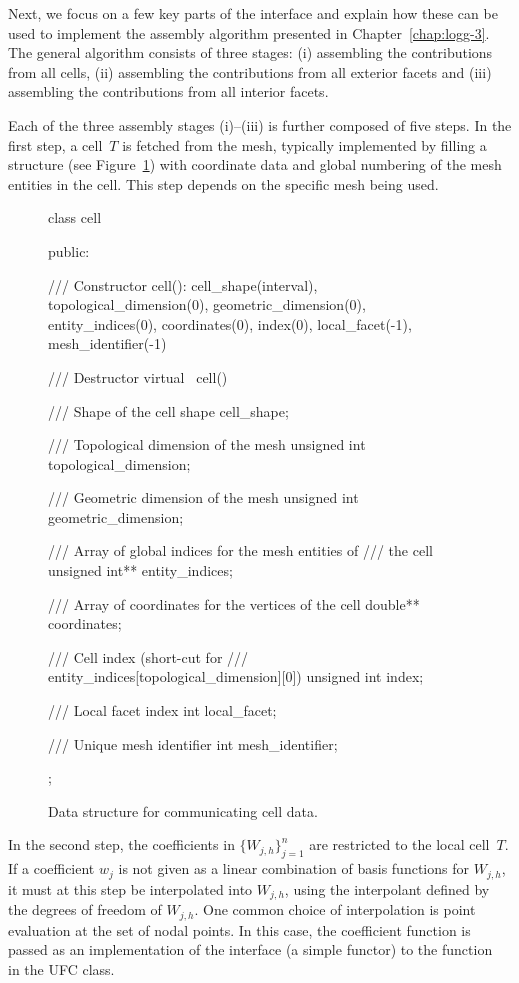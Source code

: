 Next, we focus on a few key parts of the interface and explain how
these can be used to implement the assembly algorithm presented in
Chapter~\ref{chap:logg-3}. The general algorithm consists of three
stages: (i) assembling the contributions from all cells, (ii)
assembling the contributions from all exterior facets and (iii)
assembling the contributions from all interior facets.

Each of the three assembly stages (i)--(iii) is further composed of
five steps. In the first step, a cell~$T$ is fetched from the mesh,
typically implemented by filling a  structure (see
Figure~\ref{fig:cellcode}) with coordinate data and global numbering
of the mesh entities in the cell. This step depends on the specific
mesh being used.

\begin{figure}
\bwfig
\begin{c++}
class cell
{
public:

  /// Constructor
  cell(): cell_shape(interval),
          topological_dimension(0), geometric_dimension(0),
          entity_indices(0), coordinates(0),
          index(0), local_facet(-1), mesh_identifier(-1) {}

  /// Destructor
  virtual ~cell() {}

  /// Shape of the cell
  shape cell_shape;

  /// Topological dimension of the mesh
  unsigned int topological_dimension;

  /// Geometric dimension of the mesh
  unsigned int geometric_dimension;

  /// Array of global indices for the mesh entities of
  /// the cell
  unsigned int** entity_indices;

  /// Array of coordinates for the vertices of the cell
  double** coordinates;

  /// Cell index (short-cut for
  /// entity_indices[topological_dimension][0])
  unsigned int index;

  /// Local facet index
  int local_facet;

  /// Unique mesh identifier
  int mesh_identifier;

};
\end{c++}
\caption{Data structure for communicating cell data.}
\label{fig:cellcode}
\end{figure}

In the second step, the coefficients in $\{W_{j,h}\}_{j=1}^n$ are
restricted to the local cell~$T$. If a coefficient $w_j$ is not given
as a linear combination of basis functions for $W_{j,h}$, it must at
this step be interpolated into $W_{j,h}$, using the interpolant
defined by the degrees of freedom of $W_{j,h}$. One common choice of
interpolation is point evaluation at the set of nodal points. In this
case, the coefficient function is passed as an implementation of the
 interface (a simple functor) to the
function~ in the UFC  class.

